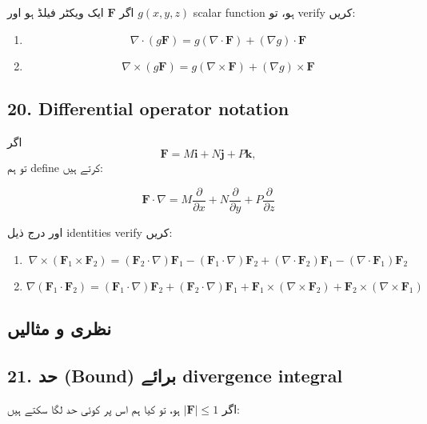 \begin{enumerate}
اگر \( \mathbf{F} \) ایک ویکٹر فیلڈ ہو اور \( g(x,y,z) \) scalar function ہو، تو verify کریں:

\begin{enumerate}
\item[a.]
\[
\nabla \cdot (g\mathbf{F})
=
g(\nabla \cdot \mathbf{F}) + (\nabla g)\cdot \mathbf{F}
\]

\item[b.]
\[
\nabla \times (g\mathbf{F})
=
g(\nabla \times \mathbf{F}) + (\nabla g)\times \mathbf{F}
\]
\end{enumerate}

\bigskip

\subsection*{20. Differential operator notation}

اگر
\[
\mathbf{F} = M\mathbf{i} + N\mathbf{j} + P\mathbf{k},
\]
تو ہم define کرتے ہیں:

\[
\mathbf{F}\cdot \nabla
=
M\frac{\partial}{\partial x}
+
N\frac{\partial}{\partial y}
+
P\frac{\partial}{\partial z}
\]

اور درج ذیل identities verify کریں:

\begin{enumerate}
\item[a.]
\[
\nabla \times (\mathbf{F}_1 \times \mathbf{F}_2)
=
(\mathbf{F}_2 \cdot \nabla)\mathbf{F}_1
-
(\mathbf{F}_1 \cdot \nabla)\mathbf{F}_2
+
(\nabla \cdot \mathbf{F}_2)\mathbf{F}_1
-
(\nabla \cdot \mathbf{F}_1)\mathbf{F}_2
\]

\item[b.]
\[
\nabla (\mathbf{F}_1 \cdot \mathbf{F}_2)
=
(\mathbf{F}_1 \cdot \nabla)\mathbf{F}_2
+
(\mathbf{F}_2 \cdot \nabla)\mathbf{F}_1
+
\mathbf{F}_1 \times (\nabla \times \mathbf{F}_2)
+
\mathbf{F}_2 \times (\nabla \times \mathbf{F}_1)
\]
\end{enumerate}

\bigskip

\subsection*{نظری و مثالیں}

\subsection*{21. حد (Bound) برائے divergence integral}

اگر \( |\mathbf{F}| \le 1 \) ہو، تو کیا ہم اس پر کوئی حد لگا سکتے ہیں:


\end{enumerate}
